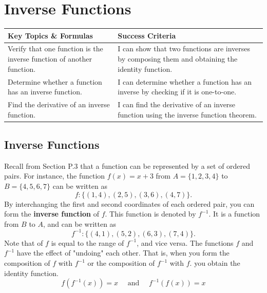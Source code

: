 \documentclass[12pt, letterpaper]{article}
\begin{document}
\newpage
\section{Inverse Functions}

\begin{objectives}
    \renewcommand{\arraystretch}{1.5} %
    \begin{tabularx}{\textwidth}{@{} >{\raggedright\arraybackslash}X >{\raggedright\arraybackslash}X @{}}
        
        \textbf{Key Topics \& Formulas} & \textbf{Success Criteria} \\ 
        \midrule[1.5pt] %
        
        Verify that one function is the inverse function of another function.
        & I can show that two functions are inverses by composing them and obtaining the identity function. \\
        \midrule %
        
        Determine whether a function has an inverse function.
        & I can determine whether a function has an inverse by checking if it is one-to-one. \\
        \midrule

        Find the derivative of an inverse function.
        & I can find the derivative of an inverse function using the inverse function theorem.
    \end{tabularx}
\end{objectives}

\subsection{Inverse Functions}

Recall from Section P.3 that a function can be represented by a set of ordered pairs. For instance, the function $f(x)=x+3$ from $A=\{1,2,3,4\}$ to $B=\{4,5,6,7\}$ can be written as 
$$f: \{ (1,4),(2,5),(3,6),(4,7) \}.$$
By interchanging the first and second coordinates of each ordered pair, you can form
the \textbf{inverse function} of $f$. This function is denoted by $f^{-1}$. It is a function from $B$ to $A$, and can be written as 
$$f^{-1}: \{(4,1),(5,2),(6,3),(7,4)\}.$$
Note that of $f$ is equal to the range of $f^{-1}$, and vice versa. The functions $f$ and $f^{-1}$ have the effect of "undoing" each other. That is, when you form the composition of $f$ with $f^{-1}$ or the composition of $f^{-1}$ with $f$. you obtain the identity function.
$$f(f^{-1}(x))=x \quad \text{ and } \quad f^{-1}(f(x))=x$$
\end{document}
